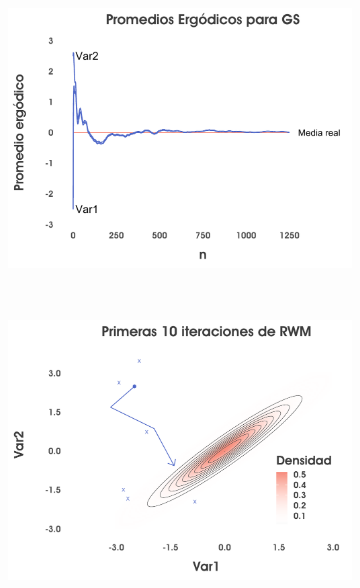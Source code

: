 \begin{figure}
\begin{subfigure}{0.31\textwidth}
        \includegraphics[width=\textwidth]{Figs/Bayes/Ejemplo_GS_Compara3}
    \end{subfigure}
    ~
    \begin{subfigure}{0.31\textwidth}
        \includegraphics[width=\textwidth]{Figs/Bayes/Ejemplo_RWM_Compara2A}
    \end{subfigure}
    ~
    \begin{subfigure}{0.31\textwidth}

\end{subfigure}
\end{figure}
